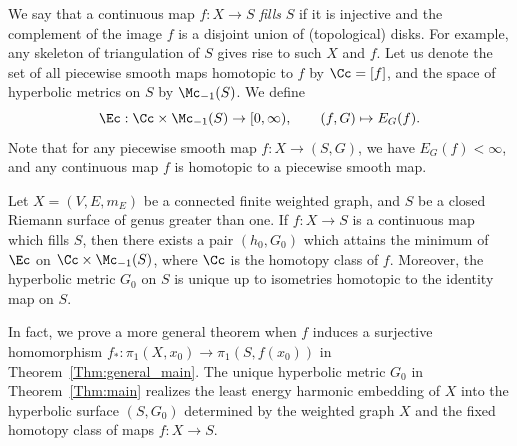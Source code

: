 We say that a continuous map $f:X \to S$ \emph{fills} $S$ if it is injective and the complement of the image $f$ is a disjoint union of (topological) disks. For example, any skeleton of triangulation of $S$ gives rise to such $X$ and $f$. Let us denote the set of all piecewise smooth maps homotopic to $f$ by $\Cc=[f]$, and the space of hyperbolic metrics on $S$ by $\Mc_{-1}(S)$. We define
\[
\Ec: \Cc \times \Mc_{-1}(S) \to [0, \infty), \qquad (f, G) \mapsto E_G(f).
\]
Note that for any piecewise smooth map $f: X \to (S, G)$, we have $E_G(f)<\infty$, and any continuous map $f$ is homotopic to a piecewise smooth map.

\begin{theo}\label{Thm:main}
Let $X=(V, E, m_E)$ be a connected finite weighted graph, and $S$ be a closed Riemann surface of genus greater than one. If $f:X \to S$ is a continuous map which fills $S$, then there exists a pair $(h_0, G_0)$ which attains the minimum of $\Ec$ on $\Cc \times \Mc_{-1}(S)$, where $\Cc$ is the homotopy class of $f$. Moreover, the hyperbolic metric $G_0$ on $S$ is unique up to isometries homotopic to the identity map on $S$.
\end{theo}



In fact, we prove a more general theorem when $f$ induces a surjective homomorphism $f_\ast: \pi_1(X, x_0) \to \pi_1(S, f(x_0))$ in Theorem~\ref{Thm:general_main}. The unique hyperbolic metric $G_0$ in Theorem~\ref{Thm:main} realizes the least energy harmonic embedding of $X$ into the hyperbolic surface $(S, G_0)$ determined by the weighted graph $X$ and the fixed homotopy class of maps $f: X \to S$.

